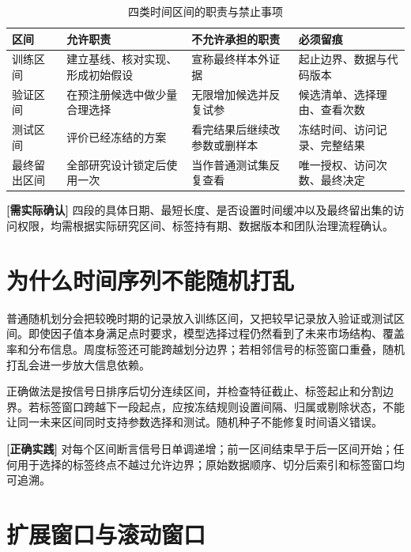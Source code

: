 \begin{table}[htbp]
  \centering
  \small
  \caption{四类时间区间的职责与禁止事项}
  \label{tab:ch07-split-roles}
  \begin{tabularx}{\textwidth}{p{2.0cm} p{4.4cm} Y Y}
    \toprule
    区间 & 允许职责 & 不允许承担的职责 & 必须留痕 \\
    \midrule
    训练区间 & 建立基线、核对实现、形成初始假设 & 宣称最终样本外证据 & 起止边界、数据与代码版本 \\
    验证区间 & 在预注册候选中做少量合理选择 & 无限增加候选并反复试参 & 候选清单、选择理由、查看次数 \\
    测试区间 & 评价已经冻结的方案 & 看完结果后继续改参数或删样本 & 冻结时间、访问记录、完整结果 \\
    最终留出区间 & 全部研究设计锁定后使用一次 & 当作普通测试集反复查看 & 唯一授权、访问次数、最终决定 \\
    \bottomrule
  \end{tabularx}
\end{table}

\begin{confirmbox}
\textbf{[需实际确认]} 四段的具体日期、最短长度、是否设置时间缓冲以及最终留出集的访问权限，均需根据实际研究区间、标签持有期、数据版本和团队治理流程确认。
\end{confirmbox}

\section{为什么时间序列不能随机打乱}

普通随机划分会把较晚时期的记录放入训练区间，又把较早记录放入验证或测试区间。即使因子值本身满足点时要求，模型选择过程仍然看到了未来市场结构、覆盖率和分布信息。周度标签还可能跨越划分边界；若相邻信号的标签窗口重叠，随机打乱会进一步放大信息依赖。

正确做法是按信号日排序后切分连续区间，并检查特征截止、标签起止和分割边界。若标签窗口跨越下一段起点，应按冻结规则设置间隔、归属或剔除状态，不能让同一未来区间同时支持参数选择和测试。随机种子不能修复时间语义错误。

\begin{practicebox}
\textbf{[正确实践]} 对每个区间断言信号日单调递增；前一区间结束早于后一区间开始；任何用于选择的标签终点不越过允许边界；原始数据顺序、切分后索引和标签窗口均可追溯。
\end{practicebox}

\section{扩展窗口与滚动窗口}

